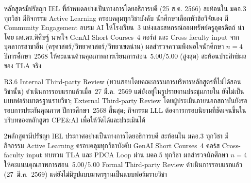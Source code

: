 \begin{strengthbox}
หลักสูตรมีปรัชญา IEL ที่กำหนดอย่างเป็นทางการโดยอธิการบดี (25 ส.ค. 2566) สะท้อนใน มคอ.3 ทุกวิชา มีกิจกรรม Active Learning ครอบคลุมทุกวิชาบังคับ นักศึกษาเลือกหัวข้อวิจัยเอง มี Community Engagement อบรม AI ให้โรงเรียน~3 แห่งและสหกรณ์ออมทรัพย์ครูอุตรดิตถ์ นำโดย ผศ.ดร.พิศิษฐ์ นาคใจ GenAI Short Courses~4 คอร์ส และ Cross-faculty input จากบุคลากรสาขาอื่น (ครุศาสตร์/วิทยาศาสตร์/วิทยาเขตน่าน) ผลสำรวจความพึงพอใจนักศึกษา $n=4$ ปีการศึกษา~2568 ให้คะแนนด้านคุณภาพการเรียนการสอน~5.00/5.00 (สูงสุด) สะท้อนประสิทธิผลของ TLA จริง
\end{strengthbox}

\begin{weaknessbox}
R3.6 Internal Third-party Review (ทวนสอบโดยคณะกรรมการบริหารหลักสูตรที่ไม่ได้สอนวิชานั้น) ดำเนินการรอบแรกแล้วเมื่อ~27 มี.ค.~2569 แต่ยังอยู่ในรูปรายงานประชุมภายใน ยังไม่เป็นแบบฟอร์มมาตรฐานรายวิชา; External Third-party Review โดยผู้ประเมินภายนอกสถาบันยังรอรอบการประกันคุณภาพ ปีการศึกษา~2568 สิ้นสุด; กิจกรรม LLL ต้องการกรอบนิยามที่ชัดเจนขึ้นในบริบทของหลักสูตร CPE\&AI เพื่อให้วัดได้และประเมินได้
\end{weaknessbox}

\begin{selfassessmentbox}{2}{หลักสูตรมีปรัชญา IEL ประกาศอย่างเป็นทางการโดยอธิการบดี สะท้อนใน มคอ.3 ทุกวิชา มีกิจกรรม Active Learning ครอบคลุมทุกวิชาบังคับ GenAI Short Courses~4 คอร์ส Cross-faculty input ทบทวน TLA และ PDCA Loop ผ่าน มคอ.5 ทุกวิชา ผลสำรวจนักศึกษา $n=4$ ให้คะแนนคุณภาพการสอน~5.00/5.00 Formal Third-party Review ดำเนินการรอบแรกแล้ว (27~มี.ค.~2569) แต่ยังไม่มีรูปแบบมาตรฐานเป็นแบบฟอร์มรายวิชา}
\end{selfassessmentbox}

